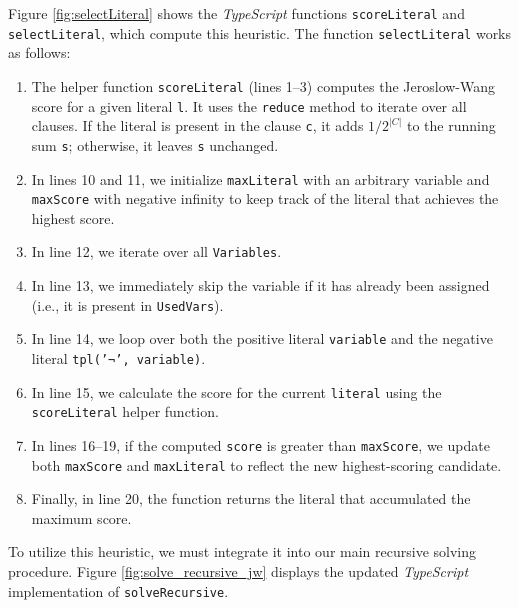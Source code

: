 Figure \ref{fig:selectLiteral} shows the \textsl{TypeScript} functions
\texttt{scoreLiteral} and \texttt{selectLiteral}, which compute this heuristic.  The function \texttt{selectLiteral} works as follows:
\begin{enumerate}
\item The helper function \texttt{scoreLiteral} (lines 1--3) computes the Jeroslow-Wang score for a given
  literal \texttt{l}. It uses the \texttt{reduce} method to iterate over all clauses. If the literal is present
  in the clause \texttt{c}, it adds $1 / 2^{|C|}$ to the running sum \texttt{s}; otherwise, it leaves
  \texttt{s} unchanged. 
\item In lines 10 and 11, we initialize \texttt{maxLiteral} with an arbitrary variable and \texttt{maxScore}
  with negative infinity to keep track of the literal that achieves the highest score. 
\item In line 12, we iterate over all \texttt{Variables}.
\item In line 13, we immediately skip the variable if it has already been assigned (i.e., it is present in
  \texttt{UsedVars}). 
\item In line 14, we loop over both the positive literal \texttt{variable} and the negative literal
  \texttt{tpl('¬', variable)}. 
\item In line 15, we calculate the score for the current \texttt{literal} using the \texttt{scoreLiteral}
  helper function. 
\item In lines 16--19, if the computed \texttt{score} is greater than \texttt{maxScore}, we update both
  \texttt{maxScore} and \texttt{maxLiteral} to reflect the new highest-scoring candidate. 
\item Finally, in line 20, the function returns the literal that accumulated the maximum score. 
\end{enumerate}

\FloatBarrier

To utilize this heuristic, we must integrate it into our main recursive solving procedure. Figure
\ref{fig:solve_recursive_jw} displays the updated \textsl{TypeScript} implementation of
\texttt{solveRecursive}. 

